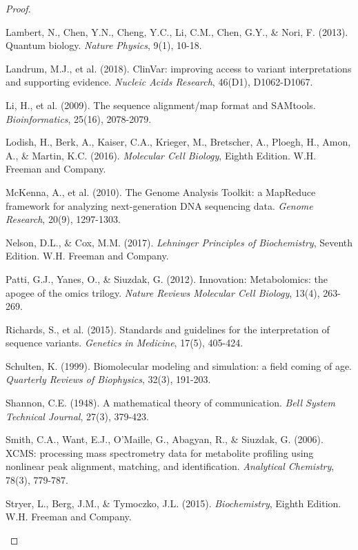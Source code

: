 \documentclass[12pt,a4paper]{article}
\begin{document}
\begin{proof}
\begin{thebibliography}{99}
Lambert, N., Chen, Y.N., Cheng, Y.C., Li, C.M., Chen, G.Y., \& Nori, F. (2013). Quantum biology. \textit{Nature Physics}, 9(1), 10-18.

Landrum, M.J., et al. (2018). ClinVar: improving access to variant interpretations and supporting evidence. \textit{Nucleic Acids Research}, 46(D1), D1062-D1067.

Li, H., et al. (2009). The sequence alignment/map format and SAMtools. \textit{Bioinformatics}, 25(16), 2078-2079.

Lodish, H., Berk, A., Kaiser, C.A., Krieger, M., Bretscher, A., Ploegh, H., Amon, A., \& Martin, K.C. (2016). \textit{Molecular Cell Biology}, Eighth Edition. W.H. Freeman and Company.

McKenna, A., et al. (2010). The Genome Analysis Toolkit: a MapReduce framework for analyzing next-generation DNA sequencing data. \textit{Genome Research}, 20(9), 1297-1303.

Nelson, D.L., \& Cox, M.M. (2017). \textit{Lehninger Principles of Biochemistry}, Seventh Edition. W.H. Freeman and Company.

Patti, G.J., Yanes, O., \& Siuzdak, G. (2012). Innovation: Metabolomics: the apogee of the omics trilogy. \textit{Nature Reviews Molecular Cell Biology}, 13(4), 263-269.

Richards, S., et al. (2015). Standards and guidelines for the interpretation of sequence variants. \textit{Genetics in Medicine}, 17(5), 405-424.

Schulten, K. (1999). Biomolecular modeling and simulation: a field coming of age. \textit{Quarterly Reviews of Biophysics}, 32(3), 191-203.

Shannon, C.E. (1948). A mathematical theory of communication. \textit{Bell System Technical Journal}, 27(3), 379-423.

Smith, C.A., Want, E.J., O'Maille, G., Abagyan, R., \& Siuzdak, G. (2006). XCMS: processing mass spectrometry data for metabolite profiling using nonlinear peak alignment, matching, and identification. \textit{Analytical Chemistry}, 78(3), 779-787.

Stryer, L., Berg, J.M., \& Tymoczko, J.L. (2015). \textit{Biochemistry}, Eighth Edition. W.H. Freeman and Company.


\end{thebibliography}
\end{proof}
\end{document}
